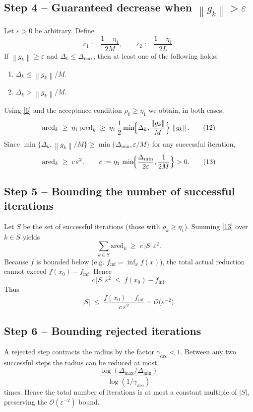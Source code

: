 \documentclass{article}
\newcommand{\norm}[1]{\left\lVert#1\right\rVert}
\begin{document}
\subsection*{Step 4 – Guaranteed decrease when $\norm{g_{k}}>\varepsilon$}
Let $\varepsilon>0$ be arbitrary. Define
\[
c_{1}:=\frac{1-\eta_{1}}{2M},\qquad
c_{2}:=\frac{1-\eta_{1}}{2L}.
\]
If $\norm{g_{k}}\ge\varepsilon$ and $\Delta_{k}\le\Delta_{\max}$, then at least one of the following holds:
\begin{enumerate}[label=(\alph*)]
\item $\Delta_{k}\le \norm{g_{k}}/M$.
\item $\Delta_{k}> \norm{g_{k}}/M$.
\end{enumerate}
Using \eqref{6} and the acceptance condition $\rho_{k}\ge\eta_{1}$ we obtain, in both cases,
\[
\text{ared}_{k}\;\ge\;\eta_{1}\,\text{pred}_{k}
\;\ge\;\eta_{1}\,\frac12\min\!\Bigl\{\Delta_{k},\frac{\norm{g_{k}}}{M}\Bigr\}\,\norm{g_{k}} .
\tag{12}
\]
Since $\min\{\Delta_{k},\norm{g_{k}}/M\}\ge
\min\bigl\{\Delta_{\min},\varepsilon/M\bigr\}$ for any successful iteration,
\[
\text{ared}_{k}\;\ge\;c\,\varepsilon^{2},
\qquad 
c:=\eta_{1}\,\min\!\Bigl\{\frac{\Delta_{\min}}{2\varepsilon},\frac{1}{2M}\Bigr\}>0 .
\tag{13}
\]

\subsection*{Step 5 – Bounding the number of successful iterations}
Let $S$ be the set of successful iterations (those with $\rho_{k}\ge\eta_{1}$). Summing \eqref{13} over $k\in S$ yields
\[
\sum_{k\in S}\text{ared}_{k}\;\ge\;c\,|S|\,\varepsilon^{2}.
\tag{14}
\]
Because $f$ is bounded below (e.g. $f_{\inf}=\inf_{x}f(x)$), the total actual reduction cannot exceed $f(x_{0})-f_{\inf}$. Hence
\[
c\,|S|\,\varepsilon^{2}\;\le\;f(x_{0})-f_{\inf}.
\tag{15}
\]
Thus
\[
|S|\;\le\;\frac{f(x_{0})-f_{\inf}}{c\,\varepsilon^{2}}
=\mathcal{O}\!\bigl(\varepsilon^{-2}\bigr).
\tag{16}
\]

\subsection*{Step 6 – Bounding rejected iterations}
A rejected step contracts the radius by the factor $\gamma_{\text{dec}}<1$. Between any two successful steps the radius can be reduced at most
\[
\frac{\log(\Delta_{\max}/\Delta_{\min})}{\log(1/\gamma_{\text{dec}})}
\]
times. Hence the total number of iterations is at most a constant multiple of $|S|$, preserving the $\mathcal{O}(\varepsilon^{-2})$ bound.
\end{document}
